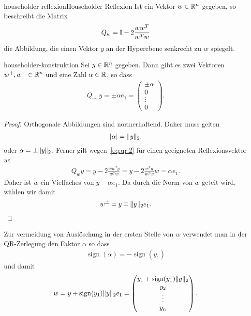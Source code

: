 \begin{Definition*}{householder-reflexion}{Householder-Reflexion}
  Ist ein Vektor $w\in \mathbb R^n$ gegeben, so beschreibt die Matrix
  \begin{gather}
    Q_w = \mathbb I - 2\frac{ww^T}{w^Tw}
  \end{gather}
  die Abbildung, die einen Vektor $y$ an der Hyperebene senkrecht zu
  $w$ spiegelt.
\end{Definition*}

\begin{Lemma}{householder-konstruktion}
  Sei $y\in\mathbb R^n$ gegeben. Dann gibt es zwei Vektoren $w^+,w^-\in\mathbb R^n$
  und eine Zahl $\alpha\in \mathbb R$, so dass
  \begin{gather}
    \label{eq:qr:2}
    Q_{w^\pm} y = \pm \alpha e_1 =
    \begin{pmatrix}
      \pm \alpha\\0\\\vdots\\0
    \end{pmatrix}.
  \end{gather}
\end{Lemma}

\begin{proof}
  Orthogonale Abbildungen sind normerhaltend. Daher muss gelten
  \begin{gather}
    \lvert\alpha\rvert = \lVert y\rVert_2.
  \end{gather}
  oder $\alpha = \pm\lVert y\rVert_2$.  Ferner gilt
  wegen~\eqref{eq:qr:2} für einen geeigneten Reflexionsvektor $w$:
  \begin{gather}
    Q_{w} y = y-2 \frac{ww^Ty}{w^Tw} = y-2\frac{w^Ty}{w^Tw}w = \alpha e_1.
  \end{gather}
  Daher ist $w$ ein Vielfaches von $y - \alpha e_1$. Da durch die Norm
  von $w$ geteit wird, wählen wir damit
  \begin{gather}
    w^{\pm} = y\mp \lVert y\rVert_2 e_1.
  \end{gather}
\end{proof}

\begin{remark}
  Zur vermeidung von Auslöschung in der ersten Stelle von $w$
  verwendet man in der QR-Zerlegung den Faktor $\alpha$ so dass
  \begin{gather}
    \operatorname{sign} (\alpha) = -\operatorname{sign} (y_1)
  \end{gather}
  und damit
  \begin{gather}
    w = y + \operatorname{sign} (y_1) \lVert y\rVert_2 e_1
    =
    \begin{pmatrix}
      y_1 + \operatorname{sign} (y_1) \lVert y\rVert_2\\
      y_2\\\vdots\\y_n
    \end{pmatrix}.
  \end{gather}
\end{remark}

